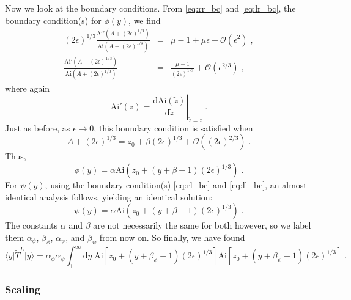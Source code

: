 \documentclass[a4paper,10pt]{article}
\newcommand{\D}{\mathrm{d}}
\newcommand{\Or}{\mathcal{O}}
\newcommand{\bra}[1]{\langle #1 \vert}
\newcommand{\ket}[1]{\vert #1 \rangle}
\newcommand{\Ai}{\mathrm{Ai}}
\begin{document}
Now we look at the boundary conditions. From \eqref{eq:rr_bc} and \eqref{eq:lr_bc}, the boundary condition(s) for $\phi(y)$, we find
\begin{eqnarray}
  (2\epsilon)^{1/3} \frac{\Ai'( A + (2\epsilon)^{1/3} )}{\Ai(A + (2\epsilon)^{1/3})} & = & \mu -1 + \mu \epsilon + \Or(\epsilon^2) \;, \\
                    \frac{\Ai'( A + (2\epsilon)^{1/3} )}{\Ai(A + (2\epsilon)^{1/3})} & = & \frac{\mu -1}{(2\epsilon)^{1/3}} + \Or(\epsilon^{2/3}) \;,
\end{eqnarray}
where again
\begin{equation}
  \Ai'(z) = \left. \frac{ \D \Ai(\tilde{z})}{\D \tilde{z}} \right|_{\tilde{z}=z} \;.
\end{equation}
Just as before, as $\epsilon\to0$, this boundary condition is satisfied when
\begin{equation}
  A + (2\epsilon)^{1/3} = z_0 + \beta(2\epsilon)^{1/3} + \Or((2\epsilon)^{2/3}) \;.
\end{equation}
Thus,
\begin{equation}
  \phi(y) = \alpha \Ai( z_0 + (y + \beta - 1)(2\epsilon)^{1/3} ) \;.
\end{equation}
For $\psi(y)$, using the boundary condition(s) \eqref{eq:rl_bc} and \eqref{eq:ll_bc}, an almost identical analysis follows, yielding an identical solution:
\begin{equation}
  \psi(y) = \alpha \Ai( z_0 + (y + \beta - 1)(2\epsilon)^{1/3} ) \;.
\end{equation}
The constants $\alpha$ and $\beta$ are not necessarily the same for both however, so we label them $\alpha_\phi$, $\beta_\phi$, $\alpha_\psi$, and $\beta_\psi$ from now on.
So finally, we have found
\begin{equation}
  \bra{y}\tilde{T}^L\ket{y} = \alpha_\phi\alpha_\psi\int_1^\infty \D y \; \Ai[ z_0 + (y + \beta_\phi - 1)(2\epsilon)^{1/3} ]\Ai[ z_0 + (y + \beta_\psi - 1)(2\epsilon)^{1/3} ] \;.
\end{equation}

\subsubsection{Scaling}
\end{document}
